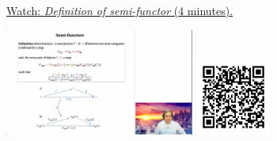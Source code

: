 
\begin{minipage}{10cm}
    \href{https://act4e-spring21.netlify.app/videos/spring2021-functors:semi-and-fun:semi-fun-def.html}{Watch: \emph{Definition of semi-functor} (4 minutes).}
        
    \href{https://act4e-spring21.netlify.app/videos/spring2021-functors:semi-and-fun:semi-fun-def.html}{\includegraphics[height=3.5cm]{spring2021-functors:semi-and-fun:semi-fun-def/thumbnails.jpg}}
    \href{https://act4e-spring21.netlify.app/videos/spring2021-functors:semi-and-fun:semi-fun-def.html}{\includegraphics[height=2.5cm]{spring2021-functors:semi-and-fun:semi-fun-def/qrcode.png}}
\end{minipage}
